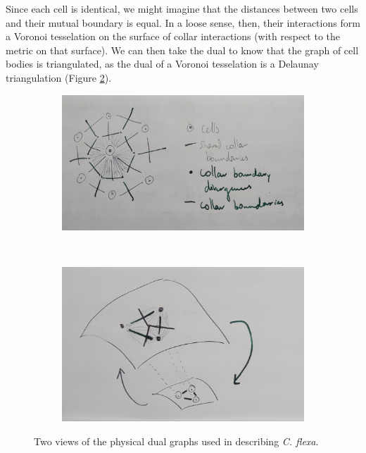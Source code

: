 \documentclass[draft]{article}
\begin{document}
Since each cell is identical, we might imagine that the distances between two cells and their mutual boundary is equal. In a loose sense, then, their interactions form a Voronoi tesselation on the surface of collar interactions (with respect to the metric on that surface). We can then take the dual to know that the graph of cell bodies is triangulated, as the dual of a Voronoi tesselation is a Delaunay triangulation (Figure \ref{subfig:duals2}).

\begin{figure}[htbp]
    \centering
    \begin{subfigure}[b]{0.52\textwidth}
        \includegraphics[width=\textwidth]{figures/duals1.jpg}
        \caption{}
        \label{subfig:duals1}
    \end{subfigure}
    ~
    \begin{subfigure}[b]{0.46\textwidth}
        \includegraphics[width=\textwidth]{figures/duals2.jpg}
        \caption{}
        \label{subfig:duals2}
    \end{subfigure}
    \caption{Two views of the physical dual graphs used in describing \textit{C. flexa}.}
    \label{fig:duals}
\end{figure}
\end{document}
